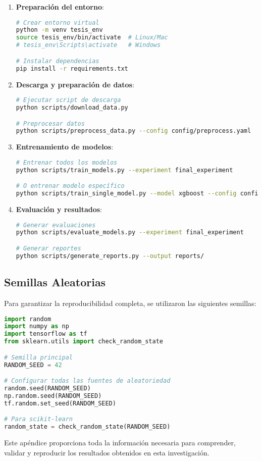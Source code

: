 \begin{enumerate}
    \item \textbf{Preparación del entorno}:
    \begin{lstlisting}[language=bash]
# Crear entorno virtual
python -m venv tesis_env
source tesis_env/bin/activate  # Linux/Mac
# tesis_env\Scripts\activate   # Windows

# Instalar dependencias
pip install -r requirements.txt
    \end{lstlisting}
    
    \item \textbf{Descarga y preparación de datos}:
    \begin{lstlisting}[language=bash]
# Ejecutar script de descarga
python scripts/download_data.py

# Preprocesar datos
python scripts/preprocess_data.py --config config/preprocess.yaml
    \end{lstlisting}
    
    \item \textbf{Entrenamiento de modelos}:
    \begin{lstlisting}[language=bash]
# Entrenar todos los modelos
python scripts/train_models.py --experiment final_experiment

# O entrenar modelo específico
python scripts/train_single_model.py --model xgboost --config config/xgb_final.yaml
    \end{lstlisting}
    
    \item \textbf{Evaluación y resultados}:
    \begin{lstlisting}[language=bash]
# Generar evaluaciones
python scripts/evaluate_models.py --experiment final_experiment

# Generar reportes
python scripts/generate_reports.py --output reports/
    \end{lstlisting}
\end{enumerate}

\subsection{Semillas Aleatorias}
\label{subsec:semillas}

Para garantizar la reproducibilidad completa, se utilizaron las siguientes semillas:

\begin{lstlisting}[language=Python, caption=Configuración de Semillas Aleatorias]
import random
import numpy as np
import tensorflow as tf
from sklearn.utils import check_random_state

# Semilla principal
RANDOM_SEED = 42

# Configurar todas las fuentes de aleatoriedad
random.seed(RANDOM_SEED)
np.random.seed(RANDOM_SEED)
tf.random.set_seed(RANDOM_SEED)

# Para scikit-learn
random_state = check_random_state(RANDOM_SEED)
\end{lstlisting}

Este apéndice proporciona toda la información necesaria para comprender, validar y reproducir los resultados obtenidos en esta investigación.
